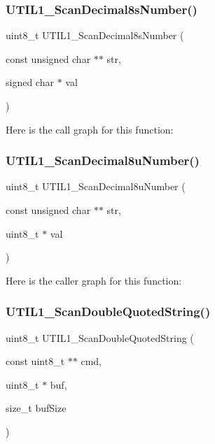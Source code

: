 \subsubsection{\texorpdfstring{U\+T\+I\+L1\+\_\+\+Scan\+Decimal8s\+Number()}{UTIL1\_ScanDecimal8sNumber()}}
{\footnotesize\ttfamily uint8\+\_\+t U\+T\+I\+L1\+\_\+\+Scan\+Decimal8s\+Number (\begin{DoxyParamCaption}\item[{const unsigned char $\ast$$\ast$}]{str,  }\item[{signed char $\ast$}]{val }\end{DoxyParamCaption})}

Here is the call graph for this function\+:
\mbox{\label{group___u_t_i_l1__module_ga46237d655750f5680f3b435c24203995}} 
\subsubsection{\texorpdfstring{U\+T\+I\+L1\+\_\+\+Scan\+Decimal8u\+Number()}{UTIL1\_ScanDecimal8uNumber()}}
{\footnotesize\ttfamily uint8\+\_\+t U\+T\+I\+L1\+\_\+\+Scan\+Decimal8u\+Number (\begin{DoxyParamCaption}\item[{const unsigned char $\ast$$\ast$}]{str,  }\item[{uint8\+\_\+t $\ast$}]{val }\end{DoxyParamCaption})}

Here is the caller graph for this function\+:
\mbox{\label{group___u_t_i_l1__module_gaee2c6d9c4dcd1780830a05234d56e7bd}} 
\subsubsection{\texorpdfstring{U\+T\+I\+L1\+\_\+\+Scan\+Double\+Quoted\+String()}{UTIL1\_ScanDoubleQuotedString()}}
{\footnotesize\ttfamily uint8\+\_\+t U\+T\+I\+L1\+\_\+\+Scan\+Double\+Quoted\+String (\begin{DoxyParamCaption}\item[{const uint8\+\_\+t $\ast$$\ast$}]{cmd,  }\item[{uint8\+\_\+t $\ast$}]{buf,  }\item[{size\+\_\+t}]{buf\+Size }\end{DoxyParamCaption})}

